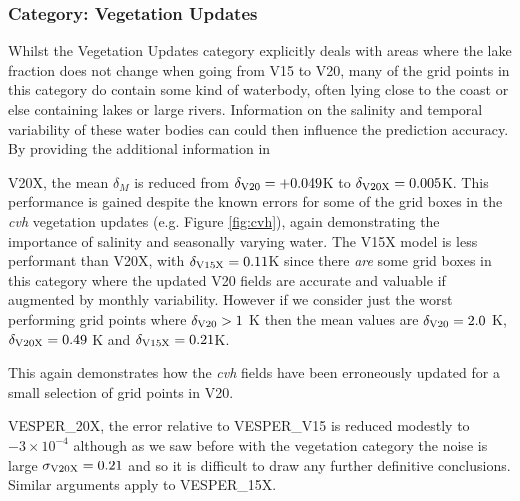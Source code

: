 \documentclass[hess, twostagejnl]{copernicus}
\providecommand{\DIFadd}[1]{{\protect\color{blue} \sf #1}} %
\providecommand{\DIFdel}[1]{{\protect\color{red} \scriptsize #1}} %
\providecommand{\DIFaddbegin}{} %
\providecommand{\DIFaddend}{} %
\providecommand{\DIFdelbegin}{} %
\providecommand{\DIFdelend}{} %
\begin{document}
\subsubsection{Category: Vegetation Updates}
Whilst the Vegetation Updates category explicitly deals with areas where the lake fraction does not change when going from V15 to V20, many of the grid points in this category do contain some kind of waterbody, often lying close to the coast or else containing lakes or large rivers. Information on the salinity and temporal variability of these water bodies \DIFdelbegin \DIFdel{can }\DIFdelend \DIFaddbegin \DIFadd{could }\DIFaddend then influence the prediction accuracy. By providing the additional information in \DIFdelbegin \DIFdel{V20X, the mean $\delta_{M}$ is reduced from $\delta_{\rm V20} = +0.049$K to $\delta_{\rm V20X} =0.005 $K. This performance is gained despite the known errors for some of the grid boxes in the \textit{cvh} vegetation updates (e.g. Figure \ref{fig:cvh}), again demonstrating the importance of salinity and seasonally varying water. The V15X model is less performant than V20X, with $\delta_{\rm V15X} = 0.11$K since there \textit{are} some grid boxes in this category where the updated V20 fields are accurate and valuable if augmented by monthly variability. However if we consider just the worst performing grid points where $\delta_{\rm V20} > 1$ K then the mean values are $\delta_{\rm V20} = 2.0$ K, $\delta_{\rm V20X} = 0.49$ K and $\delta_{\rm V15X} = 0.21$K.

This again demonstrates how the \textit{cvh} fields have been erroneously updated for a small selection of grid points in V20. 
	}\DIFdelend \DIFaddbegin \DIFadd{VESPER\_20X, the error relative to  VESPER\_V15 is reduced modestly to $-3 \times 10^{-4}$ although as we saw before with the vegetation category the noise is large $\sigma_{\rm V20X} = 0.21$ and so it is difficult to draw any further definitive conclusions. Similar arguments apply to VESPER\_15X.

}\DIFaddend 
\end{document}
